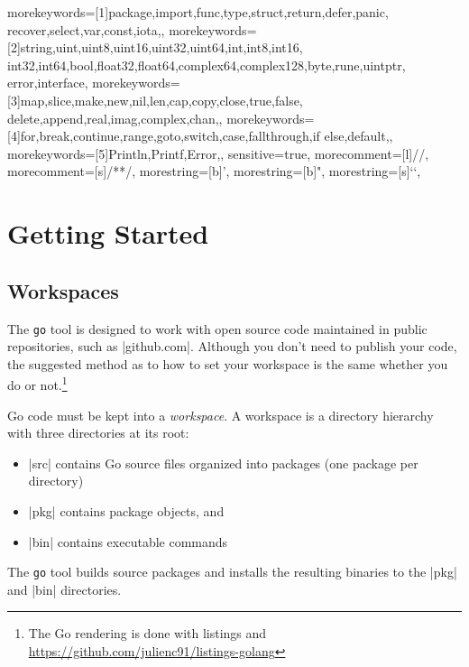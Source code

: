 \def\Go{\texttt{go}\xspace}
%
  {morekeywords=[1]{package,import,func,type,struct,return,defer,panic,%
     recover,select,var,const,iota,},%
   morekeywords=[2]{string,uint,uint8,uint16,uint32,uint64,int,int8,int16,%
     int32,int64,bool,float32,float64,complex64,complex128,byte,rune,uintptr,%
     error,interface},%
   morekeywords=[3]{map,slice,make,new,nil,len,cap,copy,close,true,false,%
     delete,append,real,imag,complex,chan,},%
   morekeywords=[4]{for,break,continue,range,goto,switch,case,fallthrough,if%
     else,default,},%
   morekeywords=[5]{Println,Printf,Error,},%
   sensitive=true,%
   morecomment=[l]{//},%
   morecomment=[s]{/*}{*/},%
   morestring=[b]',%
   morestring=[b]",%
   morestring=[s]{`}{`},%
   }
   
   
\chapter{Getting Started}

\section{Workspaces}

The \Go tool is designed to work with open source code maintained in public repositories,
such as |github.com|. Although you don't need to publish your code, the suggested method
as to how to set your workspace is the same whether you do or not.\footnote{The Go rendering is done with listings and \protect\url{https://github.com/julienc91/listings-golang}}

Go code must be kept into a \emph{workspace}. A workspace is a directory hierarchy with
three directories at its root:

\begin{itemize}
\item |src| contains Go source files organized into packages (one package per directory)
\item |pkg| contains package objects, and
\item |bin| contains executable commands
\end{itemize}

The \Go tool builds source packages and installs the resulting binaries to the |pkg| and
|bin| directories.

